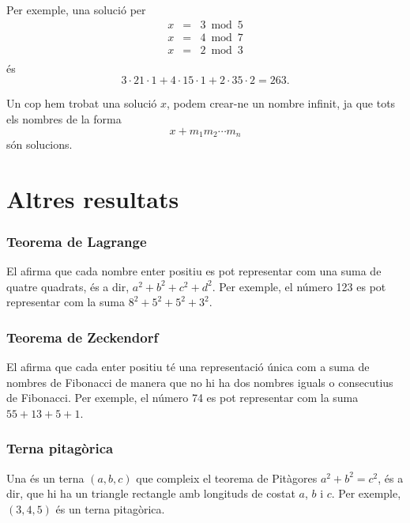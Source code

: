 Per exemple, una solució per
\[
\begin{array}{lcl}
x & = & 3 \bmod 5 \\
x & = & 4 \bmod 7 \\
x & = & 2 \bmod 3 \\
\end{array}
\]
és
\[ 3 \cdot 21 \cdot 1 + 4 \cdot 15 \cdot 1 + 2 \cdot 35 \cdot 2 = 263.\]


Un cop hem trobat una solució $x$, podem crear-ne un nombre infinit, ja que
tots els nombres de la forma
\[x+m_1 m_2 \cdots m_n\]
són solucions.

\section{Altres resultats}

\subsubsection{Teorema de Lagrange}


El  %
afirma que cada nombre enter positiu es pot representar com una suma
de quatre quadrats, és a dir, $a^2+b^2+c^2+d^2$. Per exemple, el
número 123 es pot representar com la suma $8^2+5^2+5^2+3^2$.

\subsubsection{Teorema de Zeckendorf}

 

El  %
afirma que cada enter positiu té una representació única com a suma de nombres
de Fibonacci de manera que no hi ha dos nombres iguals o consecutius de
Fibonacci. Per exemple, el número 74 es pot representar com la suma $55+13+5+1$.

\subsubsection{Terna pitagòrica}

 

Una  és un terna $(a,b,c)$ que compleix el
teorema de Pitàgores $a^2+b^2=c^2$, és a dir, que hi ha un
triangle rectangle amb longituds de costat $a$, $b$ i $c$. Per
exemple, $(3,4,5)$ és un terna pitagòrica.

